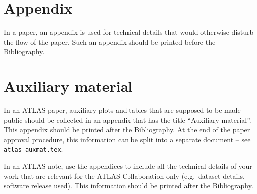 \documentclass[UKenglish,texlive=2013]{\ATLASLATEXPATH atlasdoc}
\begin{document}
\clearpage
\appendix
\part*{Appendix}

In a paper, an appendix is used for technical details that would otherwise disturb the flow of the paper.
Such an appendix should be printed before the Bibliography.


\printbibliography
%
%

\clearpage
{}

\clearpage
\appendix
\part*{Auxiliary material}

In an ATLAS paper, auxiliary plots and tables that are supposed to be made public 
should be collected in an appendix that has the title \enquote{Auxiliary material}.
This appendix should be printed after the Bibliography.
At the end of the paper approval procedure, this information can be split into a separate document
-- see \texttt{atlas-auxmat.tex}.

In an ATLAS note, use the appendices to include all the technical details of your work
that are relevant for the ATLAS Collaboration only (e.g.\ dataset details, software release used).
This information should be printed after the Bibliography.
\end{document}
